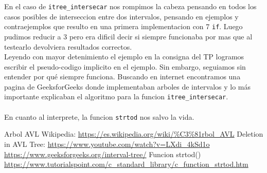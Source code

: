 \documentclass{article}
\begin{document}
	En el caso de \verb|itree_intersecar| nos rompimos la cabeza pensando en todos los casos posibles de interseccion entre dos intervalos, pensando en ejemplos y contraejemplos que resulto en una primera implementacion con 7 \verb|if|. Luego pudimos reducir a 3 pero era dificil decir si siempre funcionaba por mas que al testearlo devolviera resultados correctos.\\
	Leyendo con mayor detenimiento el ejemplo en la consigna del TP logramos escribir el pseudo-codigo implicito en el ejemplo. Sin embargo, seguiamos sin entender por qué siempre funciona. Buscando en internet encontramos una pagina de GeeksforGeeks donde implementaban arboles de intervalos y lo más importante explicaban el algoritmo para la funcion \verb|itree_intersecar|.\\\\
	En cuanto al interprete, la funcion \verb|strtod| nos salvo la vida.
	\begin{thebibliography}{4}
		\bibitem {}
			Arbol AVL Wikipedia:
			\url {https://es.wikipedia.org/wiki/%C3%81rbol_AVL}
		\bibitem {}
			Deletion in AVL Tree:
			\url {https://www.youtube.com/watch?v=LXdi_4kSd1o}
		\bibitem {}
			\url {https://www.geeksforgeeks.org/interval-tree/}
		\bibitem {}
			Funcion strtod()
			\url {https://www.tutorialspoint.com/c_standard_library/c_function_strtod.htm}
	\end{thebibliography}
\end{document}
